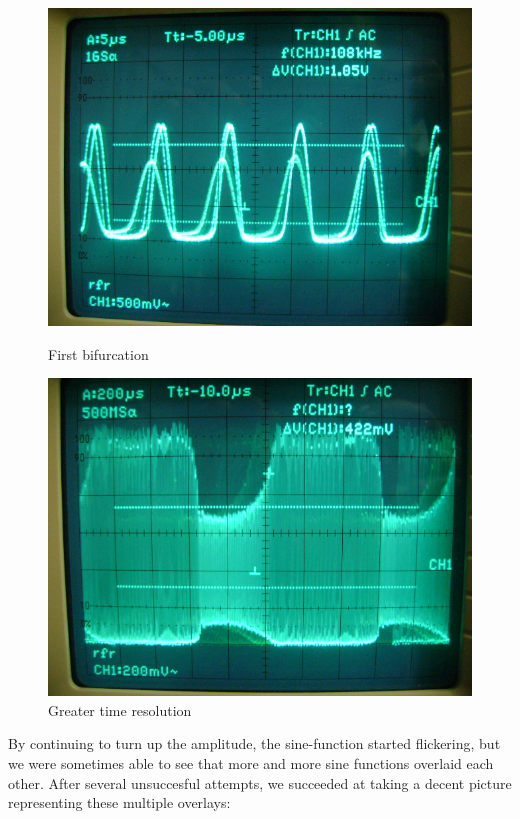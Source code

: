 \begin{figure}[H]
\begin{minipage}{0.5\textwidth}
\centering \includegraphics[width=\textwidth]{Fotos/01.JPG}
\caption{First bifurcation}
\end{minipage}
\begin{minipage}{0.5\textwidth}
\centering \includegraphics[width=\textwidth]{Fotos/02.JPG}
\caption{Greater time resolution}
\label{aaa}
\end{minipage}
\end{figure}

By continuing to turn up the amplitude, the sine-function started flickering, but we were sometimes able to see that more and more sine functions overlaid each other. After several unsuccesful attempts, we succeeded at taking a decent picture representing these multiple overlays:


